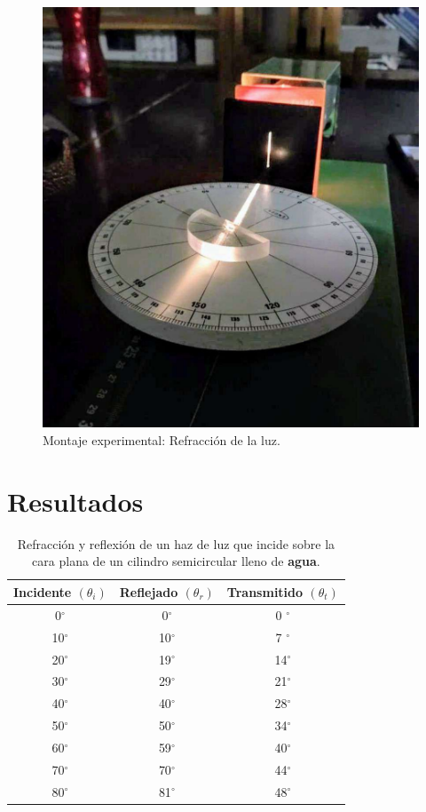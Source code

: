 \documentclass[
aps,
reprint,
amsmath, amssymb,
superscriptaddress,
]{revtex4-2}
\begin{document}
\begin{figure}
\centering
\includegraphics[width=0.5\columnwidth]{img/img1.pdf}
\caption{\label{fig:img_1} Montaje experimental: Refracción de la luz.}
\end{figure}

\section{\label{sec:resultados}Resultados}
\begin{table}[H]%
    \caption{\label{tab:tabla1} Refracción y reflexión de un haz de luz que incide sobre la cara plana de un cilindro semicircular lleno de \textbf{agua}.}
     \begin{ruledtabular}
     \begin{tabular}{ccc}
        Incidente $(\theta_i)$ & Reflejado $(\theta_r)$ & Transmitido $(\theta_t)$\\
        \hline
         0$^{\circ}$ &  0$^{\circ}$ & 0 $^{\circ}$ \\
        10$^{\circ}$ & 10$^{\circ}$ & 7 $^{\circ}$ \\
        20$^{\circ}$ & 19$^{\circ}$ & 14$^{\circ}$ \\
        30$^{\circ}$ & 29$^{\circ}$ & 21$^{\circ}$ \\
        40$^{\circ}$ & 40$^{\circ}$ & 28$^{\circ}$ \\
        50$^{\circ}$ & 50$^{\circ}$ & 34$^{\circ}$ \\
        60$^{\circ}$ & 59$^{\circ}$ & 40$^{\circ}$ \\
        70$^{\circ}$ & 70$^{\circ}$ & 44$^{\circ}$ \\
        80$^{\circ}$ & 81$^{\circ}$ & 48$^{\circ}$ \\
     \end{tabular}
     \end{ruledtabular}
\end{table}
\end{document}
